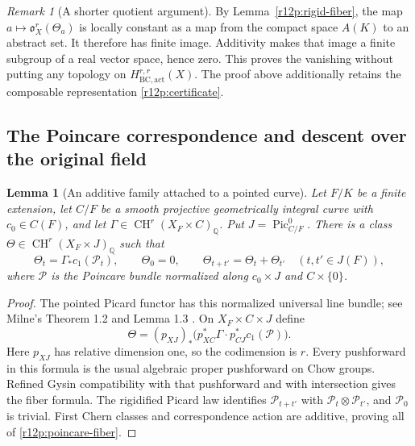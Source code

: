 \documentclass[11pt]{article}
\newtheorem{lemma}[theorem]{Lemma}
\theoremstyle{definition}
\theoremstyle{remark}
\newtheorem{remark}[theorem]{Remark}
\numberwithin{equation}{section}
\begin{document}
\begin{remark}[A shorter quotient argument]
By Lemma~\ref{r12p:rigid-fiber}, the map
$a\mapsto\mathfrak o_X^r(\Theta_a)$ is locally constant as a map
from the compact space $A(K)$ to an abstract set.  It therefore has
finite image.  Additivity makes that image a finite subgroup of a
real vector space, hence zero.  This proves the vanishing without
putting any topology on $H_{\mathrm{BC,act}}^{r,r}(X)$.
The proof above additionally retains the composable representation
\eqref{r12p:certificate}.
\end{remark}

\subsection{The Poincare correspondence and descent over the original field}

\begin{lemma}[An additive family attached to a pointed curve]
\label{r12p:poincare}
Let $F/K$ be a finite extension, let $C/F$ be a smooth projective
geometrically integral curve with $c_0\in C(F)$, and let
$\Gamma\in\operatorname{CH}^r(X_F\times C)_{\mathbb Q}$.
Put $J=\operatorname{Pic}^0_{C/F}$.  There is a class
$\Theta\in\operatorname{CH}^r(X_F\times J)_{\mathbb Q}$ such that
\[
 \Theta_t=\Gamma_*c_1(\mathcal P_t),\qquad
 \Theta_0=0,\qquad \Theta_{t+t'}=\Theta_t+\Theta_{t'}
 \quad(t,t'\in J(F)),
\tag{R12.P8}\label{r12p:poincare-fiber}
\]
where $\mathcal P$ is the Poincare bundle normalized along
$c_0\times J$ and $C\times\{0\}$.
\end{lemma}

\begin{proof}
The pointed Picard functor has this normalized universal line bundle;
see Milne's Theorem 1.2 and Lemma 1.3 \cite{MilneJV}.  On
$X_F\times C\times J$ define
\[
 \Theta=(p_{XJ})_*\bigl(p_{XC}^*\Gamma\cdot
                              p_{CJ}^*c_1(\mathcal P)\bigr).
\tag{R12.P9}\label{r12p:poincare-family}
\]
Here $p_{XJ}$ has relative dimension one, so the codimension is $r$.
Every pushforward in this formula is the usual algebraic proper
pushforward on Chow groups.  Refined Gysin compatibility with that
pushforward and with intersection gives the fiber formula.
The rigidified Picard law identifies
$\mathcal P_{t+t'}$ with $\mathcal P_t\otimes\mathcal P_{t'}$,
and $\mathcal P_0$ is trivial.  First Chern classes and correspondence
action are additive, proving all of \eqref{r12p:poincare-fiber}.
\end{proof}
\end{document}
